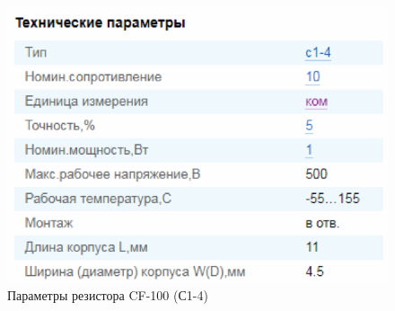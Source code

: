 \begin{figure}[h!]
	\centering
	\caption{Параметры резистора CF-100 (С1-4)}
	\includegraphics{images/3.png}
\end{figure}

